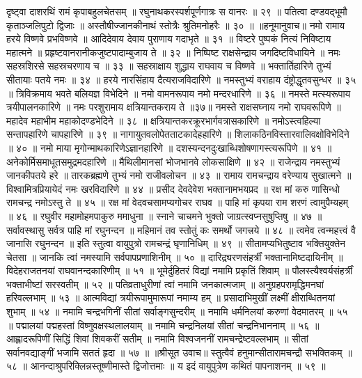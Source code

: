 दृष्ट्वा दाशरथिं रामं कृपाबहुलचेतसम् ॥
रघुनाथकरस्पर्शपूर्णगात्रः स वानरः ॥ २९ ॥
पतित्वा दण्डवद्भूमौ कृताञ्जलिपुटो द्विजाः ॥
अस्तौषीज्जानकीनाथं स्तोत्रैः श्रुतिमनोहरैः ॥ ३० ॥
॥हनूमानुवाच॥
नमो रामाय हरये विष्णवे प्रभविष्णवे ॥
आदिदेवाय देवाय पुराणाय गदाभृते ॥ ३१ ॥
विष्टरे पुष्पकं नित्यं निविष्टाय महात्मने ॥
प्रहृष्टवानरानीकजुष्टपादाम्बुजाय ते ॥ ३२ ॥
निष्पिष्ट राक्षसेन्द्राय जगदिष्टविधायिने ॥
नमः सहस्रशिरसे सहस्रचरणाय च ॥ ३३ ॥
सहस्राक्षाय शुद्धाय राघवाय च विष्णवे ॥
भक्तार्तिहारिणे तुभ्यं सीतायाः पतये नमः ॥ ३४ ॥
हरये नारसिंहाय दैत्यराजविदारिणे ॥
नमस्तुभ्यं वराहाय दंष्ट्रोद्धृतवसुन्धर ॥ ३५ ॥
त्रिविक्रमाय भवते बलियज्ञ विभेदिने ॥
नमो वामनरूपाय नमो मन्दरधारिणे ॥ ३६ ॥
नमस्ते मत्स्यरूपाय त्रयीपालनकारिणे ॥
नमः परशुरामाय क्षत्रियान्तकराय ते ॥३७॥
नमस्ते राक्षसघ्नाय नमो राघवरूपिणे ॥
महादेव महाभीम महाकोदण्डभेदिने ॥ ३८ ॥
क्षत्रियान्तकरक्रूरभार्गवत्रासकारिणे ॥
नमोऽस्त्वहिल्या सन्तापहारिणे चापहारिणे ॥ ३९ ॥
नागायुतवलोपेतताटकादेहहारिणे ॥
शिलाकठिनविस्तारवालिवक्षोविभेदिने ॥ ४० ॥
नमो माया मृगोन्माथकारिणेऽज्ञानहारिणे ॥
दशस्यन्दनदुःखाब्धिशोषणागस्त्यरूपिणे ॥ ४१ ॥
अनेकोर्मिसमाधूतसमुद्रमदहारिणे ॥
मैथिलीमानसां भोजभानवे लोकसाक्षिणे ॥ ४२ ॥
राजेन्द्राय नमस्तुभ्यं जानकीपतये हरे ॥
तारकब्रह्मणे तुभ्यं नमो राजीवलोचन ॥ ४३ ॥
रामाय रामचन्द्राय वरेण्याय सुखात्मने ॥
विश्वामित्रप्रियायेदं नमः खरविदारिणे ॥ ४४ ॥
प्रसीद देवदेवेश भक्तानामभयप्रद ॥
रक्ष मां करु णासिन्धो रामचन्द्र नमोऽस्तु ते ॥ ४५ ॥
रक्ष मां वेदवचसामप्यगोचर राघव ॥
पाहि मां कृपया राम शरणं त्वामुपैम्यहम् ॥ ४६ ॥
रघुवीर महामोहमपाकुरु ममाधुना ॥
स्नाने चाचमने भुक्तो जाग्रत्स्वप्नसुषुप्तिषु ॥ ४७ ॥
सर्वावस्थासु सर्वत्र पाहि मां रघुनन्दन ॥
महिमानं तव स्तोतुं कः समर्थो जगत्त्रये ॥ ४८ ॥
त्वमेव त्वन्महत्त्वं वै जानासि रघुनन्दन ॥
इति स्तुत्वा वायुपुत्रो रामचन्द्रं घृणानिधिम् ॥ ४९ ॥
सीतामप्यभितुष्टाव भक्तियुक्तेन चेतसा ॥
जानकि त्वां नमस्यामि सर्वपापप्रणाशिनीम् ॥ ५० ॥
दारिद्र्यरणसंहर्त्रीं भक्तानामिष्टदायिनीम् ॥
विदेहराजतनयां राघवानन्दकारिणीम् ॥ ५१ ॥
भूमेर्दुहितरं विद्यां नमामि प्रकृतिं शिवाम् ॥
पौलस्त्यैश्वर्यसंहर्त्रीं भक्ताभीष्टां सरस्वतीम् ॥ ५२ ॥
पतिव्रताधुरीणां त्वां नमामि जनकात्मजाम् ॥
अनुग्रहपरामृद्धिमनघां हरिवल्लभाम् ॥ ५३ ॥
आत्मविद्यां त्रयीरूपामुमारूपां नमाम्य हम् ॥
प्रसादाभिमुखीं लक्ष्मीं क्षीराब्धितनयां शुभाम् ॥ ५४ ॥
नमामि चन्द्रभगिनीं सीतां सर्वाङ्गसुन्दरीम् ॥
नमामि धर्मनिलयां करुणां वेदमातरम् ॥ ५५ ॥
पद्मालयां पद्महस्तां विष्णुवक्षस्थलालयाम् ॥
नमामि चन्द्रनिलयां सीतां चन्द्रनिभाननाम् ॥ ५६ ॥
आह्लादरूपिणीं सिद्धिं शिवां शिवकरीं सतीम् ॥
नमामि विश्वजननीं रामचन्द्रेष्टवल्लभाम् ॥
सीतां सर्वानवद्याङ्गीं भजामि सततं हृदा ॥ ५७ ॥
॥श्रीसूत उवाच॥
स्तुत्वैवं हनुमान्सीतारामचन्द्रौ सभक्तिकम् ॥ ५८ ॥
आनन्दाश्रुपरिक्लिन्नस्तूष्णीमास्ते द्विजोत्तमाः ॥
य इदं वायुपुत्रेण कथितं पापनाशनम् ॥ ५९ ॥
